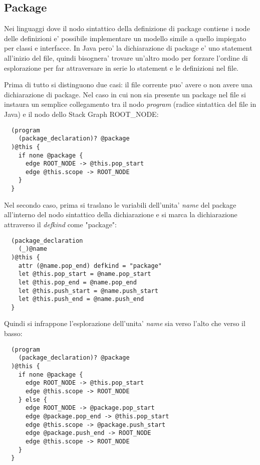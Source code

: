 \subsection{Package}

Nei linguaggi dove il nodo sintattico della definizione di package contiene i node delle definizioni e' possibile implementare un modello simile a quello impiegato per classi e interfacce.
In Java pero' la dichiarazione di package e' uno statement all'inizio del file, quindi bisognera' trovare un'altro modo per forzare l'ordine di esplorazione per far attraversare in serie lo statement e le definizioni nel file.

Prima di tutto si distinguono due casi: il file corrente puo' avere o non avere una dichiarazione di package.
Nel caso in cui non sia presente un package nel file si instaura un semplice collegamento tra il nodo \emph{program} (radice sintattica del file in Java) e il nodo dello Stack Graph ROOT\_NODE:

\begin{lstlisting}
  (program
    (package_declaration)? @package
  )@this {
    if none @package {
      edge ROOT_NODE -> @this.pop_start
      edge @this.scope -> ROOT_NODE
    }
  }
\end{lstlisting}

Nel secondo caso, prima si traslano le variabili dell'unita' \emph{name} del package all'interno del nodo sintattico della dichiarazione e si marca la dichiarazione attraverso il \emph{defkind} come "package":

\begin{lstlisting}
  (package_declaration
    (_)@name
  )@this {
    attr (@name.pop_end) defkind = "package"
    let @this.pop_start = @name.pop_start
    let @this.pop_end = @name.pop_end
    let @this.push_start = @name.push_start
    let @this.push_end = @name.push_end
  }
\end{lstlisting}

Quindi si infrappone l'esplorazione dell'unita' \emph{name} sia verso l'alto che verso il basso:

\begin{lstlisting}
  (program
    (package_declaration)? @package
  )@this {
    if none @package {
      edge ROOT_NODE -> @this.pop_start
      edge @this.scope -> ROOT_NODE
    } else {
      edge ROOT_NODE -> @package.pop_start
      edge @package.pop_end -> @this.pop_start
      edge @this.scope -> @package.push_start
      edge @package.push_end -> ROOT_NODE
      edge @this.scope -> ROOT_NODE
    }
  }
\end{lstlisting}

